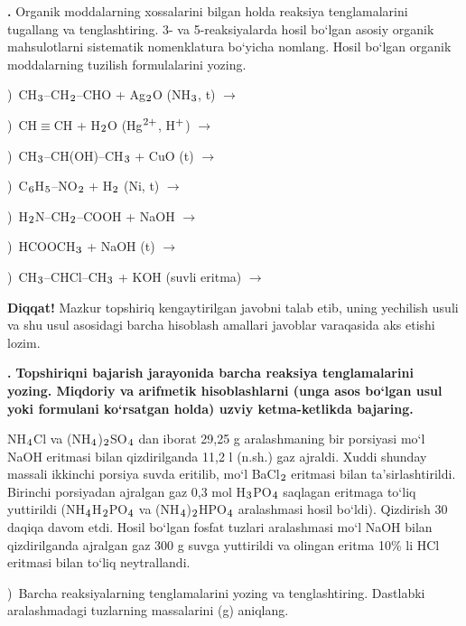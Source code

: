\documentclass[11pt,a4paper]{article}
\renewcommand{\textsubscript}[1]{\ensuremath{_{\text{\fontsize{8}{8}\selectfont #1}}}}
\renewcommand{\textsuperscript}[1]{\ensuremath{^{\text{\fontsize{8}{8}\selectfont #1}}}}
\newcommand{\qn}[1]{\textbf{\fontsize{11.5}{13}\selectfont #1}}
\newcommand{\qsep}{\par\vspace{13pt}}
\newcommand{\diqqat}[1]{\par\smallskip\noindent\textbf{Diqqat!} #1\par\medskip}
\begin{document}
\noindent\qn{42.} Organik moddalarning xossalarini bilgan holda reaksiya tenglamalarini tugallang va tenglashtiring. 3- va 5-reaksiyalarda hosil bo`lgan asosiy organik mahsulotlarni sistematik nomenklatura bo`yicha nomlang. Hosil bo`lgan organik moddalarning tuzilish formulalarini yozing.\par
{})\ CH\textsubscript{3}--CH\textsubscript{2}--CHO + Ag\textsubscript{2}O (NH\textsubscript{3}, t) $\to$\par
{})\ CH$\equiv$CH + H\textsubscript{2}O (Hg\textsuperscript{2+}, H\textsuperscript{+}) $\to$\par
{})\ CH\textsubscript{3}--CH(OH)--CH\textsubscript{3} + CuO (t) $\to$\par
{})\ C\textsubscript{6}H\textsubscript{5}--NO\textsubscript{2} + H\textsubscript{2} (Ni, t) $\to$\par
{})\ H\textsubscript{2}N--CH\textsubscript{2}--COOH + NaOH $\to$\par
{})\ HCOOCH\textsubscript{3} + NaOH (t) $\to$\par
{})\ CH\textsubscript{3}--CHCl--CH\textsubscript{3} + KOH (suvli eritma) $\to$\par
\diqqat{Mazkur topshiriq kengaytirilgan javobni talab etib, uning yechilish usuli va shu usul asosidagi barcha hisoblash amallari javoblar varaqasida aks etishi lozim.}\qsep
\noindent\qn{43.} \textbf{Topshiriqni bajarish jarayonida barcha reaksiya tenglamalarini yozing. Miqdoriy va arifmetik hisoblashlarni (unga asos bo`lgan usul yoki formulani ko`rsatgan holda) uzviy ketma-ketlikda bajaring.}\par\smallskip
NH\textsubscript{4}Cl va (NH\textsubscript{4})\textsubscript{2}SO\textsubscript{4} dan iborat 29,25 g aralashmaning bir porsiyasi mo`l NaOH eritmasi bilan qizdirilganda 11,2 l (n.sh.) gaz ajraldi. Xuddi shunday massali ikkinchi porsiya suvda eritilib, mo`l BaCl\textsubscript{2} eritmasi bilan ta'sirlashtirildi. Birinchi porsiyadan ajralgan gaz 0,3 mol H\textsubscript{3}PO\textsubscript{4} saqlagan eritmaga to`liq yuttirildi (NH\textsubscript{4}H\textsubscript{2}PO\textsubscript{4} va (NH\textsubscript{4})\textsubscript{2}HPO\textsubscript{4} aralashmasi hosil bo`ldi). Qizdirish 30 daqiqa davom etdi. Hosil bo`lgan fosfat tuzlari aralashmasi mo`l NaOH bilan qizdirilganda ajralgan gaz 300 g suvga yuttirildi va olingan eritma 10\% li HCl eritmasi bilan to`liq neytrallandi.\par
{})\ Barcha reaksiyalarning tenglamalarini yozing va tenglashtiring. Dastlabki aralashmadagi tuzlarning massalarini (g) aniqlang.\par
\end{document}

